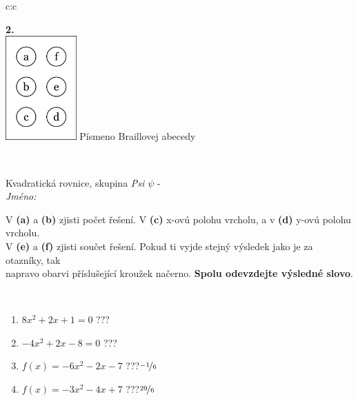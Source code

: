 \documentclass[10pt]{report}
\begin{document}
\begin{tabular}{c:c}
\begin{minipage}[c][104.5mm][t]{0.5\linewidth}
\begin{center}
\begin{minipage}{0.20\linewidth}
\begin{center}
{\Huge\bfseries 2.} \\[2mm]
\includegraphics[height=40mm]{../images/braille.png}
{\small Písmeno Braillovej abecedy}
\end{center}
\end{minipage}
\end{center}
\end{minipage}
\\ \hdashline
\begin{minipage}[c][104.5mm][t]{0.5\linewidth}
\begin{center}
\vspace{7mm}
{\huge Kvadratická rovnice, skupina \textit{Psi $\psi$} -}\\[5mm]
\textit{Jméno:}\phantom{xxxxxxxxxxxxxxxxxxxxxxxxxxxxxxxxxxxxxxxxxxxxxxxxxxxxxxxxxxxxxxxxx}\\[5mm]
\begin{minipage}{0.95\linewidth}
\begin{center}
V \textbf{(a)} a \textbf{(b)} zjisti počet řešení. V \textbf{(c)} x-ovú polohu vrcholu, a v \textbf{(d)} y-ovú polohu vrcholu.\\V \textbf{(e)} a \textbf{(f)} zjisti součet řešení. Pokud ti vyjde stejný výsledek jako je za otazníky, tak\\napravo obarvi příslušející kroužek načerno. \textbf{Spolu odevzdejte výsledné slovo}.
\end{center}
\end{minipage}
\\[1mm]
\begin{minipage}{0.79\linewidth}
\begin{center}
\begin{varwidth}{\linewidth}
\begin{enumerate}
\Large
\item $8x^2+2x+1=0$\quad \dotfill\; ???\;\dotfill {}
\item $-4x^2+2x-8=0$\quad \dotfill\; ???\;\dotfill {}
\item $f(x)=-6x^2-2x-7$\quad \dotfill\; ???\;\dotfill \quad $\nicefrac{-1}{6}$
\item $f(x)=-3x^2-4x+7$\quad \dotfill\; ???\;\dotfill \quad $\nicefrac{29}{6}$

\end{enumerate}
\end{varwidth}
\end{center}
\end{minipage}
\end{center}
\end{minipage}
\end{tabular}
\end{document}
